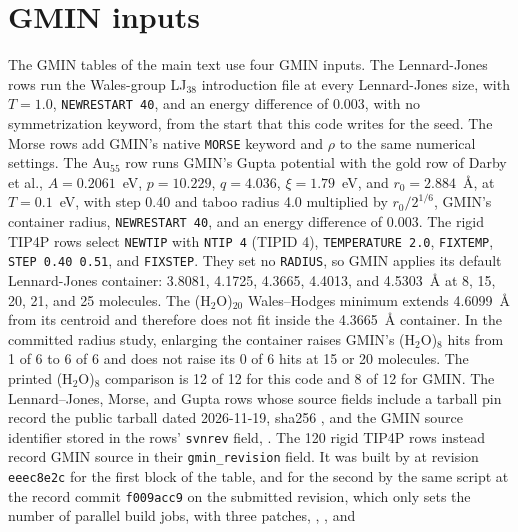 \documentclass[journal=jctcce,manuscript=suppinfo]{achemso}
\begin{document}
\section{GMIN inputs}
\label{sec:si-gmin}
The GMIN tables of the main text use four GMIN inputs.
The Lennard-Jones rows run the Wales-group LJ\(_{38}\) introduction file at every Lennard-Jones size, with \(T=1.0\), \texttt{NEWRESTART 40}, and an energy difference of 0.003, with no symmetrization keyword, from the start that this code writes for the seed.
The Morse rows add GMIN's native \texttt{MORSE} keyword and \(\rho\) to the same numerical settings.
The Au\(_{55}\) row runs GMIN's Gupta potential with the gold row of Darby et al., \(A=0.2061\)~eV, \(p=10.229\), \(q=4.036\), \(\xi=1.79\)~eV, and \(r_0=2.884\)~\AA, at \(T=0.1\)~eV, with step 0.40 and taboo radius 4.0 multiplied by \(r_0/2^{1/6}\), GMIN's container radius, \texttt{NEWRESTART 40}, and an energy difference of 0.003.
\cite{darbyCuAu2002}
The rigid TIP4P rows select \texttt{NEWTIP} with \texttt{NTIP 4}
(TIPID 4),
\texttt{TEMPERATURE 2.0}, \texttt{FIXTEMP}, \texttt{STEP 0.40 0.51}, and
\texttt{FIXSTEP}.
They set no \texttt{RADIUS}, so GMIN applies its default Lennard-Jones
container: 3.8081, 4.1725, 4.3665, 4.4013, and 4.5303~\AA{} at 8, 15, 20,
21, and 25 molecules.
The (H\(_2\)O)\(_{20}\) Wales--Hodges minimum extends 4.6099~\AA{} from
its centroid and therefore does not fit inside the 4.3665~\AA{} container.
In the committed radius study, enlarging the container raises GMIN's
(H\(_2\)O)\(_8\) hits from 1 of 6 to 6 of 6 and does not raise its 0 of 6
hits at 15 or 20 molecules.
The printed (H\(_2\)O)\(_8\) comparison is 12 of 12 for this code and 8 of
12 for GMIN.
The Lennard--Jones, Morse, and Gupta rows whose source fields include a
tarball pin record the public tarball dated 2026-11-19, sha256
\texttt{},
and the GMIN source identifier stored in the rows' \texttt{svnrev} field,
\texttt{}.
The 120 rigid TIP4P rows instead record GMIN source
\texttt{} in their
\texttt{gmin\_revision} field.
It was built by  at revision
\texttt{eeec8e2c} for the first block of the table, and for the second by the
same script at the record commit \texttt{f009acc9} on the submitted revision,
which only sets the number of parallel build jobs, with three patches,
,
, and
\end{document}
